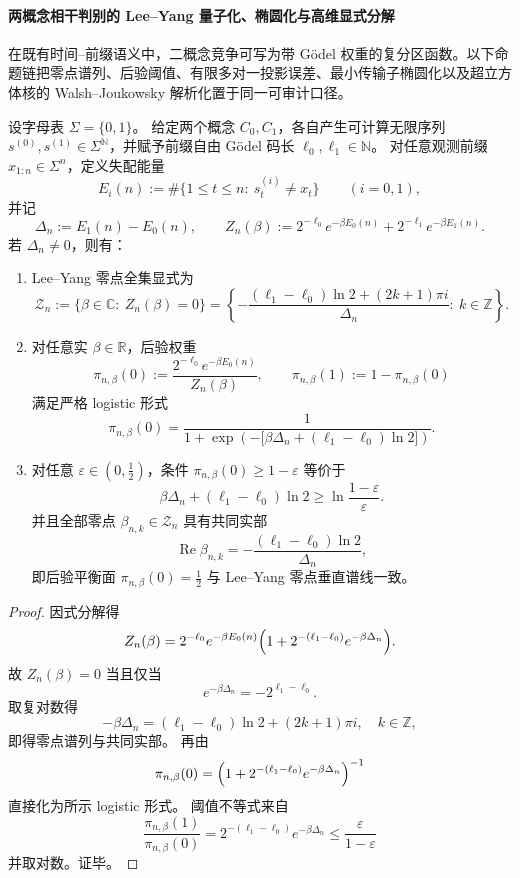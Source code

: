 \paragraph{两概念相干判别的 Lee--Yang 量子化、椭圆化与高维显式分解}
在既有时间--前缀语义中，二概念竞争可写为带 Gödel 权重的复分区函数。以下命题链把零点谱列、后验阈值、有限多对一投影误差、最小传输子椭圆化以及超立方体核的 Walsh--Joukowsky 解析化置于同一可审计口径。

\begin{theorem}\label{thm:xi-two-concept-leyang-quantization}
设字母表 \(\Sigma=\{0,1\}\)。
给定两个概念 \(C_0,C_1\)，各自产生可计算无限序列 \(s^{(0)},s^{(1)}\in\Sigma^{\mathbb N}\)，并赋予前缀自由 Gödel 码长 \(\ell_0,\ell_1\in\mathbb N\)。
对任意观测前缀 \(x_{1:n}\in\Sigma^n\)，定义失配能量
\[
E_i(n):=\#\{1\le t\le n:\ s_t^{(i)}\neq x_t\}\qquad(i=0,1),
\]
并记
\[
\Delta_n:=E_1(n)-E_0(n),
\qquad
Z_n(\beta):=2^{-\ell_0}e^{-\beta E_0(n)}+2^{-\ell_1}e^{-\beta E_1(n)}.
\]
若 \(\Delta_n\neq 0\)，则有：
\begin{enumerate}
  \item Lee--Yang 零点全集显式为
  \[
  \mathcal Z_n:=\{\beta\in\mathbb C:\ Z_n(\beta)=0\}
  =\left\{
  -\frac{(\ell_1-\ell_0)\ln 2+(2k+1)\pi i}{\Delta_n}
  :\ k\in\mathbb Z
  \right\}.
  \]
  \item 对任意实 \(\beta\in\mathbb R\)，后验权重
  \[
  \pi_{n,\beta}(0):=\frac{2^{-\ell_0}e^{-\beta E_0(n)}}{Z_n(\beta)},
  \qquad
  \pi_{n,\beta}(1):=1-\pi_{n,\beta}(0)
  \]
  满足严格 logistic 形式
  \[
  \pi_{n,\beta}(0)
  =\frac{1}{1+\exp\!\left(-\bigl[\beta\Delta_n+(\ell_1-\ell_0)\ln 2\bigr]\right)}.
  \]
  \item 对任意 \(\varepsilon\in(0,\tfrac12)\)，条件 \(\pi_{n,\beta}(0)\ge 1-\varepsilon\) 等价于
  \[
  \beta\Delta_n+(\ell_1-\ell_0)\ln 2
  \ge
  \ln\frac{1-\varepsilon}{\varepsilon}.
  \]
  并且全部零点 \(\beta_{n,k}\in\mathcal Z_n\) 具有共同实部
  \[
  \operatorname{Re}\beta_{n,k}
  =-\frac{(\ell_1-\ell_0)\ln 2}{\Delta_n},
  \]
  即后验平衡面 \(\pi_{n,\beta}(0)=\tfrac12\) 与 Lee--Yang 零点垂直谱线一致。
\end{enumerate}
\end{theorem}

\begin{proof}
因式分解得
\[
Z_n(\beta)
=
2^{-\ell_0}e^{-\beta E_0(n)}
\Bigl(1+2^{-(\ell_1-\ell_0)}e^{-\beta\Delta_n}\Bigr).
\]
故 \(Z_n(\beta)=0\) 当且仅当
\[
e^{-\beta\Delta_n}=-2^{\ell_1-\ell_0}.
\]
取复对数得
\[
-\beta\Delta_n=(\ell_1-\ell_0)\ln 2+(2k+1)\pi i,\quad k\in\mathbb Z,
\]
即得零点谱列与共同实部。
再由
\[
\pi_{n,\beta}(0)=\Bigl(1+2^{-(\ell_1-\ell_0)}e^{-\beta\Delta_n}\Bigr)^{-1}
\]
直接化为所示 logistic 形式。
阈值不等式来自
\[
\frac{\pi_{n,\beta}(1)}{\pi_{n,\beta}(0)}
=
2^{-(\ell_1-\ell_0)}e^{-\beta\Delta_n}
\le
\frac{\varepsilon}{1-\varepsilon}
\]
并取对数。证毕。
\end{proof}

